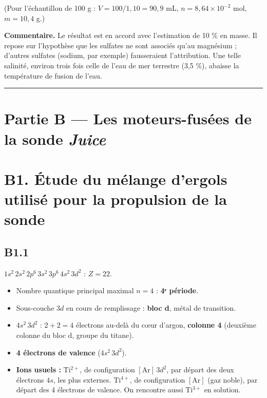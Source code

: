 \documentclass[11pt,a4paper]{article}
\providecommand{\tightlist}{\setlength{\itemsep}{0pt}\setlength{\parskip}{0pt}}
\newcommand{\equationajustee}[1]{%
  \sbox{\boiteequation}{$\displaystyle #1$}%
  \ifdim\wd\boiteequation>\linewidth
    \[\resizebox{\linewidth}{!}{\usebox{\boiteequation}}\]%
  \else
    \[#1\]%
  \fi}
\begin{document}
\equationajustee{\boxed{w = \frac{m(\mathrm{MgSO_4})}{m_{solution}} = \frac{114}{1{,}10\times10^{3}} \approx 10{,}4\ \%}}

(Pour l'échantillon de 100 g : \(V = 100/1{,}10 = 90{,}9\) mL, \(n = 8{,}64\times10^{-2}\) mol, \(m = 10{,}4\) g.)

\textbf{Commentaire.} Le résultat est en accord avec l'estimation de 10 \% en masse. Il repose sur l'hypothèse que les sulfates ne sont associés qu'au magnésium ; d'autres sulfates (sodium, par exemple) fausseraient l'attribution. Une telle salinité, environ trois fois celle de l'eau de mer terrestre (3,5 \%), abaisse la température de fusion de l'eau.

\begin{center}\rule{0.5\linewidth}{0.5pt}\end{center}

\hypertarget{partie-b-les-moteurs-fusuxe9es-de-la-sonde-juice}{%
\section{\texorpdfstring{Partie B --- Les moteurs-fusées de la sonde \emph{Juice}}{Partie B --- Les moteurs-fusées de la sonde Juice}}\label{partie-b-les-moteurs-fusuxe9es-de-la-sonde-juice}}

\hypertarget{b1.-uxe9tude-du-muxe9lange-dergols-utilisuxe9-pour-la-propulsion-de-la-sonde}{%
\section{B1. Étude du mélange d'ergols utilisé pour la propulsion de la sonde}\label{b1.-uxe9tude-du-muxe9lange-dergols-utilisuxe9-pour-la-propulsion-de-la-sonde}}

\hypertarget{b1.1}{%
\subsection{B1.1}\label{b1.1}}

\(1s^2\,2s^2\,2p^6\,3s^2\,3p^6\,4s^2\,3d^2\) : \(Z = 22\).

\begin{itemize}
\tightlist
\item
  Nombre quantique principal maximal \(n = 4\) : \textbf{4ᵉ période}.
\item
  Sous-couche \(3d\) en cours de remplissage : \textbf{bloc d}, métal de transition.
\item
  \(4s^2\,3d^2\) : \(2 + 2 = 4\) électrons au-delà du cœur d'argon, \textbf{colonne 4} (deuxième colonne du bloc d, groupe du titane).
\item
  \textbf{4 électrons de valence} (\(4s^2\,3d^2\)).
\item
  \textbf{Ions usuels :} \(\mathrm{Ti^{2+}}\), de configuration \([\mathrm{Ar}]\,3d^2\), par départ des deux électrons \(4s\), les plus externes. \(\mathrm{Ti^{4+}}\), de configuration \([\mathrm{Ar}]\) (gaz noble), par départ des 4 électrons de valence. On rencontre aussi \(\mathrm{Ti^{3+}}\) en solution.
\end{itemize}
\end{document}
